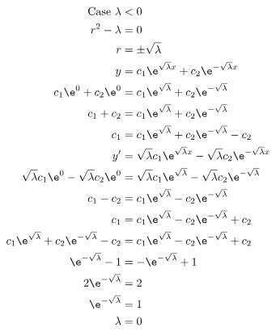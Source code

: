 \documentclass{math}
\begin{document}
\begin{align*}
  \text{Case }\lambda &< 0 \\
  r^2-\lambda &= 0 \\
  r &= \pm\sqrt{\lambda} \\
  y &= c_1\e^{\sqrt{\lambda}x}+c_2\e^{-\sqrt{\lambda}x} \\
  c_1\e^0+c_2\e^0 &= c_1\e^{\sqrt{\lambda}}+c_2\e^{-\sqrt{\lambda}} \\
  c_1+c_2 &= c_1\e^{\sqrt{\lambda}}+c_2\e^{-\sqrt{\lambda}} \\
  c_1 &= c_1\e^{\sqrt{\lambda}}+c_2\e^{-\sqrt{\lambda}}-c_2 \\
  y' &= \sqrt{\lambda}c_1\e^{\sqrt{\lambda}x}-
    \sqrt{\lambda}c_2\e^{-\sqrt{\lambda}x} \\
  \sqrt{\lambda}c_1\e^0-\sqrt{\lambda}c_2\e^0 &=
    \sqrt{\lambda}c_1\e^{\sqrt{\lambda}}-
    \sqrt{\lambda}c_2\e^{-\sqrt{\lambda}} \\
  c_1-c_2 &= c_1\e^{\sqrt{\lambda}}-c_2\e^{-\sqrt{\lambda}} \\
  c_1 &= c_1\e^{\sqrt{\lambda}}-c_2\e^{-\sqrt{\lambda}}+c_2 \\
  c_1\e^{\sqrt{\lambda}}+c_2\e^{-\sqrt{\lambda}}-c_2 &=
    c_1\e^{\sqrt{\lambda}}-c_2\e^{-\sqrt{\lambda}}+c_2 \\
  \e^{-\sqrt{\lambda}}-1 &= -\e^{-\sqrt{\lambda}}+1 \\
  2\e^{-\sqrt{\lambda}} &= 2 \\
  \e^{-\sqrt{\lambda}} &= 1 \\
  \lambda &= 0
\end{align*}
\end{document}
